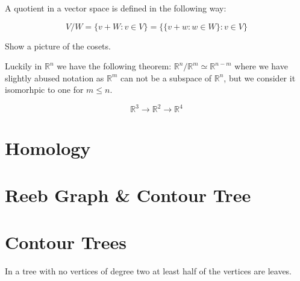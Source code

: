 A quotient in a vector space is defined in the following way: 

$$ V/W = \{v + W: v \in V\} = \{\{v + w : w \in W\} : v \in V \}$$

Show a picture of the cosets.

Luckily in $\mathbb{R}^n$ we have the following theorem: $\mathbb{R}^n / \mathbb{R}^m \simeq \mathbb{R}^{n - m} $ where we have slightly abused notation as $\mathbb{R}^m$ can not be a subspace of $\mathbb{R}^n$, but we consider it isomorhpic to one for $m \le n$.

$$ \mathbb{R}^3 {\longrightarrow} \mathbb{R}^2 {\longrightarrow} \mathbb{R}^4 $$

\section{Homology}

\section{Reeb Graph \& Contour Tree}




\section{Contour Trees}

\begin{lem} In a tree with no vertices of degree two at least half of the vertices are leaves. \end{lem}

